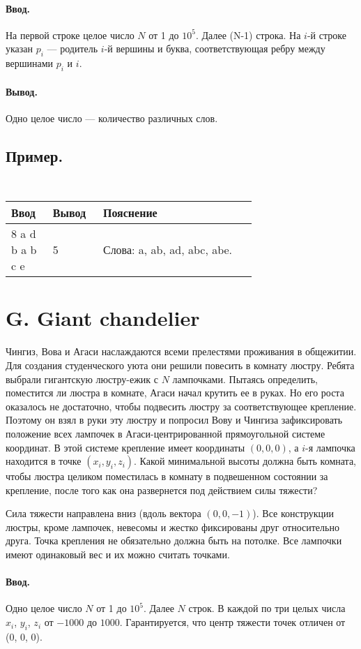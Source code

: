 \documentclass[10pt, a5paper]{article}
\newcommand{\informat}[1]
{
	\paragraph{Ввод.\\} #1
}
\newcommand{\outformat}[1]
{
	\paragraph{Вывод.\\} #1
}
\newcommand{\examplepic}[3]
{
	\subsection*{Пример.}
	{\tt
	\noindent
	\begin{tabular}{|p{0.1\linewidth}|p{0.1\linewidth}|p{0.5\linewidth}|}
	\hline
	Ввод 	& Вывод  	& Пояснение\\
	\hline
	#1 		& #2 		& #3\\
	\hline
	\end{tabular}
	}
}
\begin{document}
\informat{На первой строке целое число $N$ от 1 до $10^5$. Далее (N-1) строка. На $i$-й строке указан $p_i$ --- родитель $i$-й вершины и буква, соответствующая ребру между вершинами $p_i$ и $i$.}


\outformat{Одно целое число --- количество различных слов.}

\examplepic{
8 \newline
1 a \newline
5 d \newline
5 b \newline
1 a \newline
2 b \newline
6 c \newline
4 e
}{5}{Слова: a, ab, ad, abc, abe. \newline 
}





\section*{G. Giant chandelier}
 

Чингиз, Вова и Агаси наслаждаются всеми прелестями проживания в общежитии. Для создания студенческого уюта они решили повесить в комнату люстру. Ребята выбрали гигантскую люстру-ежик с $N$ лампочками. Пытаясь определить, поместится ли люстра в комнате, Агаси начал крутить ее в руках. Но его роста оказалось не достаточно, чтобы подвесить люстру за соответствующее крепление. Поэтому он взял в руки эту люстру и попросил Вову и Чингиза зафиксировать положение всех лампочек в Агаси-центрированной прямоугольной системе координат. В этой системе крепление имеет координаты $(0, 0, 0)$, а $i$-я лампочка находится в точке $(x_i, y_i, z_i)$. Какой минимальной высоты должна быть комната, чтобы люстра целиком поместилась в комнату в подвешенном состоянии за крепление, после того как она развернется под действием силы тяжести?

Сила тяжести направлена вниз (вдоль вектора $(0, 0, -1)$). Все конструкции люстры, кроме лампочек, невесомы и жестко фиксированы друг относительно друга. Точка крепления не обязательно должна быть на потолке. Все лампочки имеют одинаковый вес и их можно считать точками. 

\informat{Одно целое число $N$ от 1 до $10^5$. Далее $N$ строк. В каждой по три целых числа $x_i$, $y_i$, $z_i$ от $-1000$ до $1000$. Гарантируется, что центр тяжести точек отличен от (0, 0, 0).}
\end{document}
